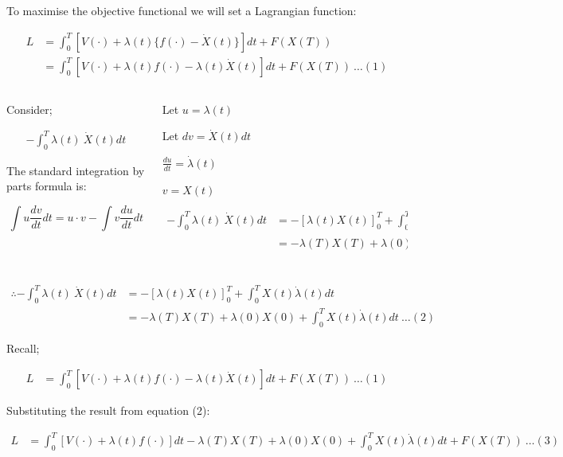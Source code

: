 \documentclass[
  ignorenonframetext,
]{beamer}
\begin{document}
\begin{frame}
To maximise the objective functional we will set a Lagrangian function:

\begin{align}
L &= \int_0^T[V(\cdot) + \lambda(t)\{f(\cdot) - \dot{X}(t)\}]dt + F(X(T))\\
  &= \int_0^T[V(\cdot) + \lambda(t)f(\cdot) - \lambda(t)\dot{X}(t)]dt + F(X(T)) \ \dots (1)
\end{align}

\begin{columns}[T]
\begin{column}{0.4\textwidth}
Consider;

\begin{align}
-\int_0^T \lambda(t)\ \dot{X}(t)dt
\end{align}

The standard integration by parts formula is:

\begin{equation}
\int u \frac{dv}{dt} dt = u \cdot v - \int v \frac{du}{dt} dt
\end{equation}
\end{column}

\begin{column}{0.55\textwidth}
Let \(u = \lambda(t)\)

Let \(dv = \dot{X}(t)dt\)

\(\frac{du}{dt} = \dot{\lambda}(t)\)

\(v = X(t)\)

\begin{align}
-\int_0^T \lambda(t)\ \dot{X}(t)dt &= -[\lambda(t)X(t)]_0^T + \int_0^T X(t)\dot{\lambda}(t)dt \\
&= -\lambda(T)X(T) + \lambda(0)X(0) + \int_0^T X(t)\dot{\lambda}(t)dt\\
\end{align}
\end{column}
\end{columns}
\end{frame}

\begin{frame}
\begin{align}
\therefore -\int_0^T \lambda(t)\ \dot{X}(t)dt &= -[\lambda(t)X(t)]_0^T + \int_0^T X(t)\dot{\lambda}(t)dt \\
&= -\lambda(T)X(T) + \lambda(0)X(0) + \int_0^T X(t)\dot{\lambda}(t)dt \ \dots (2)
\end{align}

Recall;

\begin{align}
L &= \int_0^T[V(\cdot) + \lambda(t)f(\cdot) - \lambda(t)\dot{X}(t)]dt + F(X(T))\ \dots (1)
\end{align}

Substituting the result from equation (2):

\begin{align}
L &= \int_0^T[V(\cdot) + \lambda(t)f(\cdot)]dt - \lambda(T)X(T) + \lambda(0)X(0) + \int_0^T X(t)\dot{\lambda}(t)dt + F(X(T)) \ \dots (3)
\end{align}
\end{frame}
\end{document}
